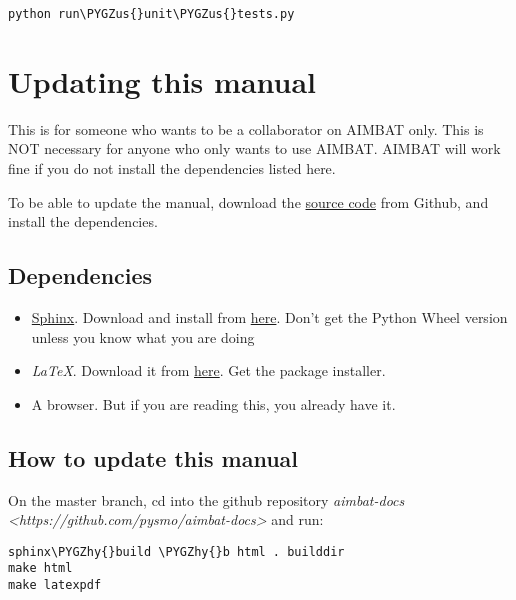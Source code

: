 \documentclass[letterpaper,10pt,english]{sphinxmanual}
\def\PYGZus{\char`\_}
\def\PYGZhy{\char`\-}
\begin{document}
\begin{Verbatim}[commandchars=\\\{\}]
python run\PYGZus{}unit\PYGZus{}tests.py
\end{Verbatim}


\chapter{Updating this manual}
\label{docfiles/updatingThisManual:updating-this-manual}\label{docfiles/updatingThisManual::doc}
This is for someone who wants to be a collaborator on AIMBAT only. This is NOT necessary for anyone who only wants to use AIMBAT. AIMBAT will work fine if you do not install the dependencies listed here.

To be able to update the manual, download the \href{https://github.com/pysmo/aimbat-docs}{source code} from Github, and install the dependencies.


\section{Dependencies}
\label{docfiles/updatingThisManual:dependencies}\begin{itemize}
\item {} 
\href{http://sphinx-doc.org/}{Sphinx}. Download and install from \href{https://pypi.python.org/pypi/Sphinx}{here}. Don't get the Python Wheel version unless you know what you are doing

\item {} 
\emph{LaTeX}. Download it from \href{http://www.tug.org/mactex/}{here}. Get the package installer.

\item {} 
A browser. But if you are reading this, you already have it.

\end{itemize}


\section{How to update this manual}
\label{docfiles/updatingThisManual:how-to-update-this-manual}
On the master branch, cd into the github repository \emph{aimbat-docs \textless{}https://github.com/pysmo/aimbat-docs\textgreater{}} and run:

\begin{Verbatim}[commandchars=\\\{\}]
sphinx\PYGZhy{}build \PYGZhy{}b html . builddir
make html
make latexpdf
\end{Verbatim}
\end{document}
